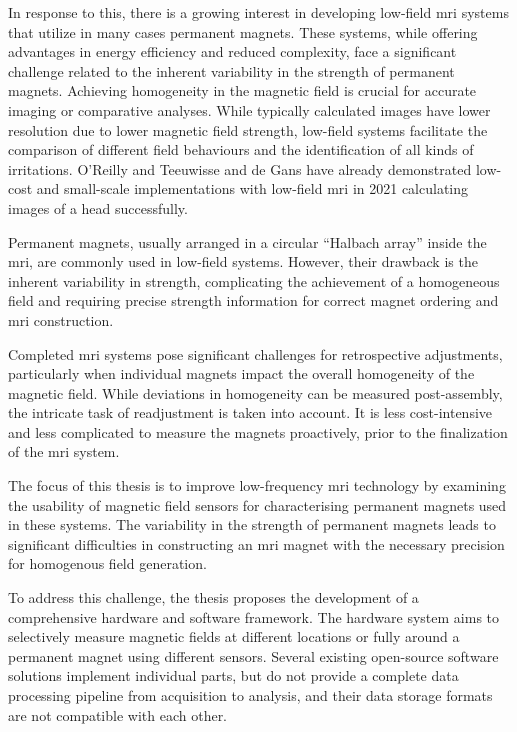 In response to this, there is a growing interest in developing low-field
\gls{mri} systems that utilize in many cases permanent magnets. These
systems, while offering advantages in energy efficiency and reduced
complexity, face a significant challenge related to the inherent
variability in the strength of permanent magnets. Achieving homogeneity
in the magnetic field is crucial for accurate imaging or comparative
analyses. While typically calculated images have lower resolution due to
lower magnetic field strength, low-field systems facilitate the
comparison of different field behaviours and the identification of all
kinds of irritations. O'Reilly and Teeuwisse and de Gans
\cite{OReilly2019-rn} have already demonstrated low-cost and
small-scale implementations with low-field \gls{mri} in 2021 calculating
images of a head successfully.

Permanent magnets, usually arranged in a circular ``Halbach array''
inside the \gls{mri}, are commonly used in low-field systems. However,
their drawback is the inherent variability in strength, complicating the
achievement of a homogeneous field and requiring precise strength
information for correct magnet ordering and \gls{mri} construction.

Completed \gls{mri} systems pose significant challenges for
retrospective adjustments, particularly when individual magnets impact
the overall homogeneity of the magnetic field. While deviations in
homogeneity can be measured post-assembly, the intricate task of
readjustment is taken into account. It is less cost-intensive and less
complicated to measure the magnets proactively, prior to the
finalization of the \gls{mri} system.

The focus of this thesis is to improve low-frequency \gls{mri}
technology by examining the usability of magnetic field sensors for
characterising permanent magnets used in these systems. The variability
in the strength of permanent magnets leads to significant difficulties
in constructing an \gls{mri} magnet with the necessary precision for
homogenous field generation.

To address this challenge, the thesis proposes the development of a
comprehensive hardware and software framework. The hardware system aims
to selectively measure magnetic fields at different locations or fully
around a permanent magnet using different sensors. Several existing
open-source software solutions implement individual parts, but do not
provide a complete data processing pipeline from acquisition to
analysis, and their data storage formats are not compatible with each
other.

